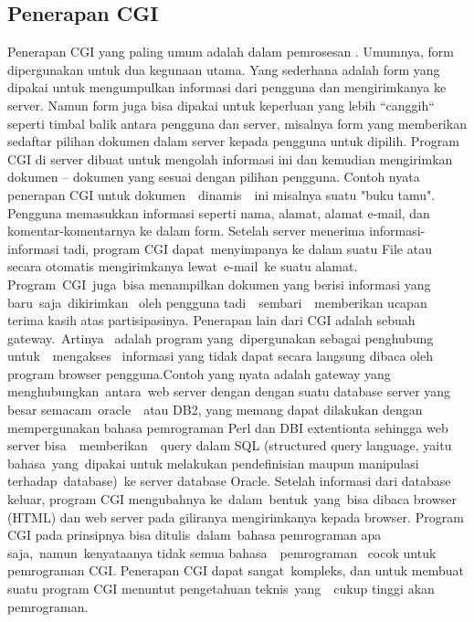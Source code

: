 \subsection{Penerapan CGI}
Penerapan CGI yang paling umum adalah dalam pemrosesan . Umumnya, form dipergunakan untuk dua kegunaan utama. Yang  sederhana  adalah form yang  dipakai  untuk mengumpulkan informasi dari pengguna dan mengirimkanya ke server. Namun  form juga bisa dipakai untuk keperluan  yang lebih  ``canggih``  seperti timbal balik antara pengguna dan server, misalnya  form  yang memberikan sedaftar pilihan dokumen dalam server kepada pengguna  untuk dipilih. Program CGI di server dibuat untuk mengolah informasi ini  dan kemudian mengirimkan  dokumen – dokumen yang sesuai  dengan  pilihan pengguna.
Contoh nyata penerapan CGI untuk dokumen~~dinamis~~ini  misalnya  suatu "buku tamu". Pengguna memasukkan informasi seperti nama, alamat, alamat e-mail, dan komentar-komentarnya ke dalam form. Setelah server menerima informasi-informasi tadi, program CGI dapat~menyimpanya ke dalam  suatu File atau secara otomatis mengirimkanya lewat~e-mail~ke  suatu  alamat. Program~CGI~juga~bisa menampilkan dokumen yang  berisi  informasi  yang
baru~saja~dikirimkan~ oleh  pengguna  tadi~~sembari~~memberikan  ucapan  terima kasih atas partisipasinya.
Penerapan lain dari CGI adalah sebuah gateway.~Artinya~ adalah  program yang~dipergunakan sebagai penghubung  untuk~~mengakses~ informasi  yang tidak dapat secara langsung dibaca oleh program browser pengguna.Contoh yang nyata adalah gateway yang menghubungkan~antara~web  server  dengan dengan suatu database server yang besar semacam~oracle~~atau  DB2, yang  memang dapat dilakukan dengan mempergunakan bahasa pemrograman Perl dan DBI extentionta sehingga web server bisa~~memberikan~~query  dalam  SQL (structured query language, yaitu bahasa~yang~dipakai  untuk  melakukan pendefinisian maupun manipulasi terhadap~database)~ke  server  database Oracle. Setelah informasi dari database keluar, program CGI mengubahnya ke~dalam~bentuk~yang~bisa dibaca browser (HTML)  dan  web  server  pada giliranya mengirimkanya kepada browser.
Program CGI pada prinsipnya bisa ditulis~dalam~bahasa  pemrograman  apa saja,~namun~kenyataanya tidak  semua  bahasa~~pemrograman~ cocok  untuk pemrograman CGI. Penerapan CGI dapat sangat~kompleks, dan untuk membuat  suatu program CGI menuntut pengetahuan teknis~yang~~cukup  tinggi  akan pemrograman.
